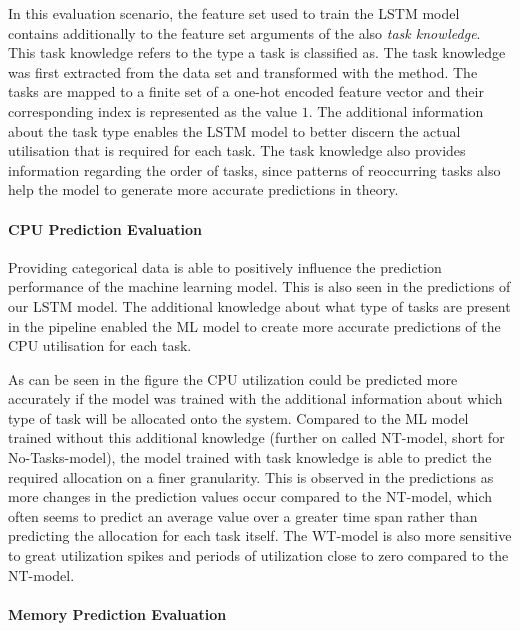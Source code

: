     In this evaluation scenario, the feature set used to train the LSTM model contains additionally to the feature set arguments of the  also \emph{task knowledge}. This task knowledge refers to the type a task is classified as. The task knowledge was first extracted from the data set and transformed with the  method. 
    The tasks are mapped to a finite set of a one-hot encoded feature vector and their corresponding index is represented as the value $1$.
    The additional information about the task type enables the LSTM model to better discern the actual utilisation that is required for each task.
    The task knowledge also provides information regarding the order of tasks, since patterns of reoccurring tasks also help the model to generate more accurate predictions in theory.

    \paragraph{CPU Prediction Evaluation}
    \label{par:cpu-prediction-evaluation-task-knowledge}

      Providing categorical data is able to positively influence the prediction performance of the machine learning model. This is also seen in the predictions of our LSTM model. The additional knowledge about what type of tasks are present in the pipeline enabled the ML model to create more accurate predictions of the CPU utilisation for each task.

      As can be seen in the figure 
      the CPU utilization could be predicted more accurately if the model was trained with the additional information about which type of task will be allocated onto the system.
      Compared to the ML model trained without this additional knowledge (further on called NT-model, short for No-Tasks-model), the model trained with task knowledge is able to predict the required allocation on a finer granularity.
      This is observed in the predictions as more changes in the prediction values occur compared to the NT-model, which often seems to predict an average value over a greater time span rather than predicting the allocation for each task itself.
      The WT-model is also more sensitive to great utilization spikes and periods of utilization close to zero compared to the NT-model.

    \paragraph{Memory Prediction Evaluation}
    \label{par:memory-prediction-evaluation-task-knowledge}

